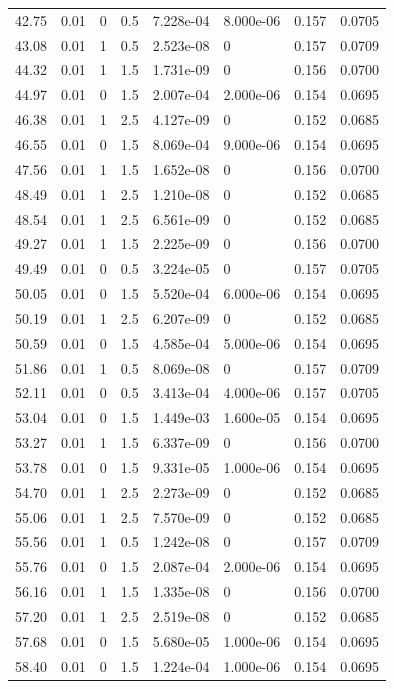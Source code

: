 \documentclass[preview]{standalone}
\begin{document}
{{{\begin{tabular}{L{1.2cm}C{1.2cm} C{0.3cm}C{0.5cm} C{1.4cm}C{1.4cm} C{1.4cm}C{1.4cm}}
  42.75  &  0.01  & 0     & 0.5 &  7.228e-04  & 8.000e-06  & 0.157 &  0.0705   \\ 
  43.08  &  0.01  & 1     & 0.5 &  2.523e-08  & 0  & 0.157 &  0.0709   \\ 
  44.32  &  0.01  & 1     & 1.5 &  1.731e-09  & 0  & 0.156 &  0.0700   \\ 
  44.97  &  0.01  & 0     & 1.5 &  2.007e-04  & 2.000e-06  & 0.154 &  0.0695   \\ 
  46.38  &  0.01  & 1     & 2.5 &  4.127e-09  & 0  & 0.152 &  0.0685   \\ 
  46.55  &  0.01  & 0     & 1.5 &  8.069e-04  & 9.000e-06  & 0.154 &  0.0695   \\ 
  47.56  &  0.01  & 1     & 1.5 &  1.652e-08  & 0  & 0.156 &  0.0700   \\ 
  48.49  &  0.01  & 1     & 2.5 &  1.210e-08  & 0  & 0.152 &  0.0685   \\ 
  48.54  &  0.01  & 1     & 2.5 &  6.561e-09  & 0  & 0.152 &  0.0685   \\ 
  49.27  &  0.01  & 1     & 1.5 &  2.225e-09  & 0  & 0.156 &  0.0700   \\ 
  49.49  &  0.01  & 0     & 0.5 &  3.224e-05  & 0  & 0.157 &  0.0705   \\ 
  50.05  &  0.01  & 0     & 1.5 &  5.520e-04  & 6.000e-06  & 0.154 &  0.0695   \\ 
  50.19  &  0.01  & 1     & 2.5 &  6.207e-09  & 0  & 0.152 &  0.0685   \\ 
  50.59  &  0.01  & 0     & 1.5 &  4.585e-04  & 5.000e-06  & 0.154 &  0.0695   \\ 
  51.86  &  0.01  & 1     & 0.5 &  8.069e-08  & 0  & 0.157 &  0.0709   \\ 
  52.11  &  0.01  & 0     & 0.5 &  3.413e-04  & 4.000e-06  & 0.157 &  0.0705   \\ 
  53.04  &  0.01  & 0     & 1.5 &  1.449e-03  & 1.600e-05  & 0.154 &  0.0695   \\ 
  53.27  &  0.01  & 1     & 1.5 &  6.337e-09  & 0  & 0.156 &  0.0700   \\ 
  53.78  &  0.01  & 0     & 1.5 &  9.331e-05  & 1.000e-06  & 0.154 &  0.0695   \\ 
  54.70  &  0.01  & 1     & 2.5 &  2.273e-09  & 0  & 0.152 &  0.0685   \\ 
  55.06  &  0.01  & 1     & 2.5 &  7.570e-09  & 0  & 0.152 &  0.0685   \\ 
  55.56  &  0.01  & 1     & 0.5 &  1.242e-08  & 0  & 0.157 &  0.0709   \\ 
  55.76  &  0.01  & 0     & 1.5 &  2.087e-04  & 2.000e-06  & 0.154 &  0.0695   \\ 
  56.16  &  0.01  & 1     & 1.5 &  1.335e-08  & 0  & 0.156 &  0.0700   \\ 
  57.20  &  0.01  & 1     & 2.5 &  2.519e-08  & 0  & 0.152 &  0.0685   \\ 
  57.68  &  0.01  & 0     & 1.5 &  5.680e-05  & 1.000e-06  & 0.154 &  0.0695   \\ 
  58.40  &  0.01  & 0     & 1.5 &  1.224e-04  & 1.000e-06  & 0.154 &  0.0695   \\ 
\hline 
\end{tabular} 

}}}
\end{document}
